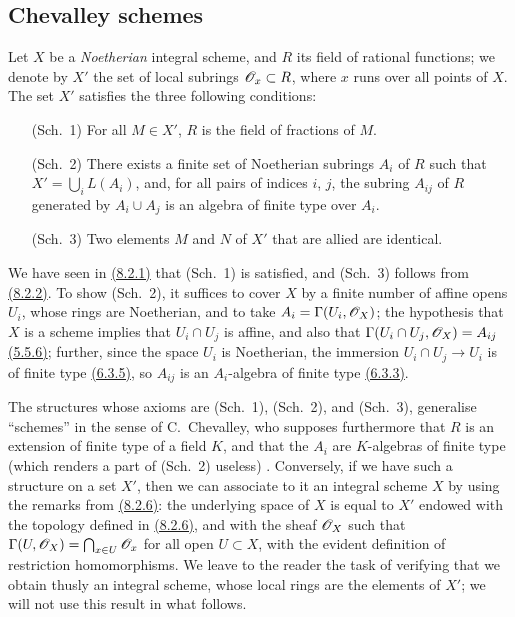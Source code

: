\subsection{Chevalley schemes}
\label{subsection-chevalley-schemes}

\begin{env}[8.3.1]
\label{env-1.8.3.1}
Let $X$ be a {\it Noetherian} integral scheme, and $R$ its
field of rational functions; we denote by $X'$ the set of local subrings
$\mathscr{O}_x\subset R$, where $x$ runs over all points of $X$. The set $X'$ satisfies
the three following conditions:
\begin{itemize}
  \item[(Sch.~1)] For all $M\in X'$, $R$ is the field of fractions of $M$.
  \item[(Sch.~2)] There exists a finite set of Noetherian subrings $A_i$ of $R$
  such that $X'=\bigcup_i L(A_i)$, and, for all pairs of indices $i$, $j$, the subring
  $A_{ij}$ of $R$ generated by $A_i\cup A_j$ is an algebra of finite type over $A_i$.
  \item[(Sch.~3)] Two elements $M$ and $N$ of $X'$ that are allied are identical.
\end{itemize}
\end{env}

We have seen in \hyperref[env-1.8.2.1]{(8.2.1)} that (Sch.~1) is satisfied, and (Sch.~3)
follows from \hyperref[env-1.8.2.2]{(8.2.2)}. To show (Sch.~2), it suffices to cover $X$ by a
finite number of affine opens $U_i$, whose rings are Noetherian, and to take
$A_i=\Gamma(U_i,\mathscr{O}_X)$; the hypothesis that $X$ is a scheme implies that
$U_i\cap U_j$ is affine, and also that $\Gamma(U_i\cap U_j,\mathscr{O}_X)=A_{ij}$
\hyperref[env-1.5.5.6]{(5.5.6)}; further, since the space $U_i$ is Noetherian, the immersion
$U_i\cap U_j\to U_i$ is of finite type \hyperref[env-1.6.3.5]{(6.3.5)}, so $A_{ij}$ is an
$A_i$-algebra of finite type \hyperref[env-1.6.3.3]{(6.3.3)}.

\begin{env}[8.3.2]
\label{env-1.8.3.2}
The structures whose axioms are (Sch.~1), (Sch.~2), and
(Sch.~3), generalise ``schemes'' in the sense of C.~Chevalley, who supposes
furthermore that $R$ is an extension of finite type of a field $K$, and that the
$A_i$ are $K$-algebras of finite type (which renders a part of (Sch.~2) useless)
\cite{I-1}. Conversely, if we have such a structure on a set $X'$, then we can
associate to it an integral scheme $X$ by using the remarks from \hyperref[env-1.8.2.6]{(8.2.6)}:
the underlying space of $X$ is equal to $X'$ endowed with the topology defined
in \hyperref[env-1.8.2.6]{(8.2.6)}, and with the sheaf $\mathscr{O}_X$ such that
$\Gamma(U,\mathscr{O}_X)=\bigcap_{x\in U}\mathscr{O}_x$ for all open $U\subset X$, with the
evident definition of restriction homomorphisms. We leave to the reader the
task of verifying that we obtain thusly an integral scheme, whose local rings
are the elements of $X'$; we will not use this result in what follows.
\end{env}

